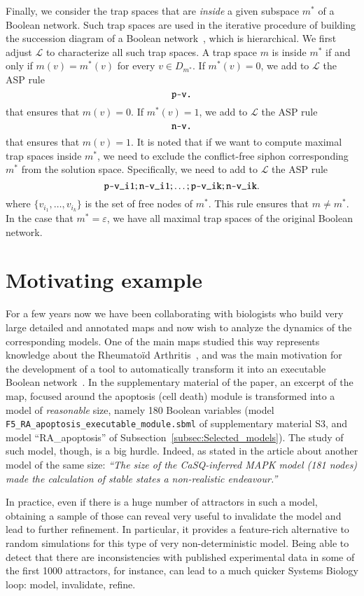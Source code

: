 \documentclass[preprint,12pt]{elsarticle}
\begin{document}
Finally, we consider the trap spaces that are \emph{inside} a given subspace \(m^{*}\) of a Boolean network.
Such trap spaces are used in the iterative procedure of building the succession diagram of a Boolean network~\cite{Rozum2021}, which is hierarchical.
We first adjust \(\mathcal{L}\) to characterize all such trap spaces.
A trap space \(m\) is inside \(m^{*}\) if and only if \(m(v) = m^{*}(v)\) for every \(v \in D_{m^{*}}\).
If \(m^{*}(v) = 0\), we add to \(\mathcal{L}\) the ASP rule
\[
  \verb|p-v.|
\]
that ensures that \(m(v) = 0\).
If \(m^{*}(v) = 1\), we add to \(\mathcal{L}\) the ASP rule
\[
  \verb|n-v.|
\]
that ensures that \(m(v) = 1\).
It is noted that if we want to compute maximal trap spaces inside \(m^{*}\), we need to exclude the conflict-free siphon corresponding \(m^{*}\) from the solution space.
Specifically, we need to add to \(\mathcal{L}\) the ASP rule
\[
  \verb|p-v_i1| ; \verb|n-v_i1| ; \dots ; \verb|p-v_ik| ; \verb|n-v_ik|.
\]
where \(\{v_{i_1}, \dots, v_{i_k}\}\) is the set of free nodes of \(m^{*}\).
This rule ensures that \(m \neq m^{*}\).
In the case that \(m^{*} = \varepsilon\), we have all maximal trap spaces of the original Boolean network.

\section{Motivating example}%
\label{sec:case_study}

For a few years now we have been collaborating with biologists who build very large detailed and annotated maps and now wish to analyze the dynamics of the corresponding models.
One of the main maps studied this way represents knowledge about the Rheumatoïd Arthritis~\cite{singh2018computational}, and was the main motivation for the development of a tool to automatically transform it into an executable Boolean network~\cite{aghamiri2020automated}.
In the supplementary material of the paper, an excerpt of the map, focused around the apoptosis (cell death) module is transformed into a model of \emph{reasonable} size, namely 180 Boolean variables (model \verb|F5_RA_apoptosis_executable_module.sbml| of supplementary material S3, and model ``RA\_apoptosis'' of Subsection~\ref{subsec:Selected_models}).
The study of such model, though, is a big hurdle.
Indeed, as stated in the article about another model of the same size:
\emph{``The size of the CaSQ-inferred MAPK model (181 nodes) made the calculation of stable states a non-realistic endeavour.''}

In practice, even if there is a huge number of attractors in such a model, obtaining a sample of those can reveal very useful to invalidate the model and lead to further refinement.
In particular, it provides a feature-rich alternative to random simulations for this type of very non-deterministic model.
Being able to detect that there are inconsistencies with published experimental data in some of the first 1000 attractors, for instance, can lead to a much quicker Systems Biology loop: model, invalidate, refine.
\end{document}
